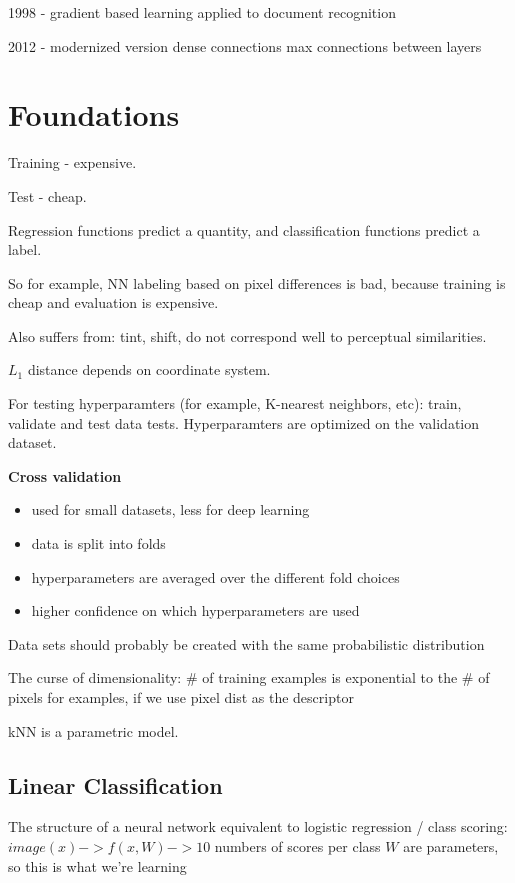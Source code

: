 1998 - gradient based learning applied to document recognition

2012 - modernized version
dense connections 
max connections between layers

\section{Foundations}

Training - expensive.

Test - cheap.

Regression functions predict a quantity, and classification functions predict a label.

So for example, NN labeling based on pixel differences is bad, because training is cheap and evaluation is expensive. 

Also suffers from: tint, shift, do not correspond well to perceptual similarities.

$L_1$ distance depends on coordinate system.

For testing hyperparamters (for example, K-nearest neighbors, etc): train, validate and test data tests. Hyperparamters are optimized on the validation dataset. 

\textbf{Cross validation}
\begin{itemize}
\item used for small datasets, less for deep learning
\item data is split into folds
\item hyperparameters are averaged over the different fold choices
\item higher confidence on which hyperparameters are used
\end{itemize}

Data sets should probably be created with the same probabilistic distribution

The curse of dimensionality: \# of training examples is exponential to the \# of pixels for examples, if we use pixel dist as the descriptor

kNN is a parametric model.

\subsection{Linear Classification}

The structure of a neural network equivalent to logistic regression / class scoring:
$image(x) -> f(x,W) -> 10$ numbers of scores per class
$W$ are parameters, so this is what we're learning


